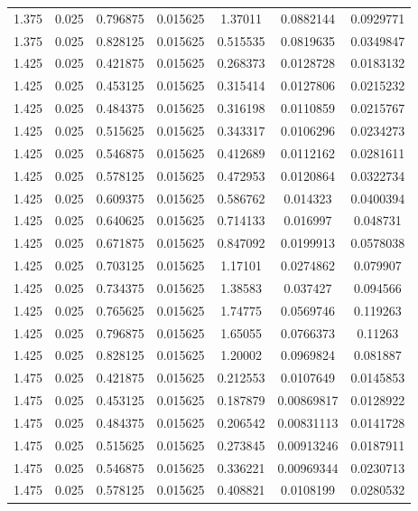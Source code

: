 \begin{table}[bh]
\begin{center}
{\begin{tabular}{ccccccc}
1.375	 & 0.025 & 	0.796875	 & 0.015625	 & 1.37011	 & 0.0882144	 & 0.0929771 \\ 
1.375	 & 0.025 & 	0.828125	 & 0.015625	 & 0.515535	 & 0.0819635	 & 0.0349847 \\ 
1.425	 & 0.025 & 	0.421875	 & 0.015625	 & 0.268373	 & 0.0128728	 & 0.0183132 \\ 
1.425	 & 0.025 & 	0.453125	 & 0.015625	 & 0.315414	 & 0.0127806	 & 0.0215232 \\ 
1.425	 & 0.025 & 	0.484375	 & 0.015625	 & 0.316198	 & 0.0110859	 & 0.0215767 \\ 
1.425	 & 0.025 & 	0.515625	 & 0.015625	 & 0.343317	 & 0.0106296	 & 0.0234273 \\ 
1.425	 & 0.025 & 	0.546875	 & 0.015625	 & 0.412689	 & 0.0112162	 & 0.0281611 \\ 
1.425	 & 0.025 & 	0.578125	 & 0.015625	 & 0.472953	 & 0.0120864	 & 0.0322734 \\ 
1.425	 & 0.025 & 	0.609375	 & 0.015625	 & 0.586762	 & 0.014323	 & 0.0400394 \\ 
1.425	 & 0.025 & 	0.640625	 & 0.015625	 & 0.714133	 & 0.016997	 & 0.048731 \\ 
1.425	 & 0.025 & 	0.671875	 & 0.015625	 & 0.847092	 & 0.0199913	 & 0.0578038 \\ 
1.425	 & 0.025 & 	0.703125	 & 0.015625	 & 1.17101	 & 0.0274862	 & 0.079907 \\ 
1.425	 & 0.025 & 	0.734375	 & 0.015625	 & 1.38583	 & 0.037427	 & 0.094566 \\ 
1.425	 & 0.025 & 	0.765625	 & 0.015625	 & 1.74775	 & 0.0569746	 & 0.119263 \\ 
1.425	 & 0.025 & 	0.796875	 & 0.015625	 & 1.65055	 & 0.0766373	 & 0.11263 \\ 
1.425	 & 0.025 & 	0.828125	 & 0.015625	 & 1.20002	 & 0.0969824	 & 0.081887 \\ 
1.475	 & 0.025 & 	0.421875	 & 0.015625	 & 0.212553	 & 0.0107649	 & 0.0145853 \\ 
1.475	 & 0.025 & 	0.453125	 & 0.015625	 & 0.187879	 & 0.00869817	 & 0.0128922 \\ 
1.475	 & 0.025 & 	0.484375	 & 0.015625	 & 0.206542	 & 0.00831113	 & 0.0141728 \\ 
1.475	 & 0.025 & 	0.515625	 & 0.015625	 & 0.273845	 & 0.00913246	 & 0.0187911 \\ 
1.475	 & 0.025 & 	0.546875	 & 0.015625	 & 0.336221	 & 0.00969344	 & 0.0230713 \\ 
1.475	 & 0.025 & 	0.578125	 & 0.015625	 & 0.408821	 & 0.0108199	 & 0.0280532 \\ 

\end{tabular}}
\end{center}
\end{table}
